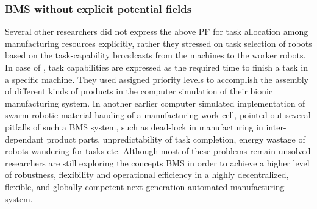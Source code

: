 \subsubsection*{BMS without explicit potential fields}
Several other researchers did not express the above PF for task allocation among manufacturing resources explicitly, rather they stressed on task selection of robots based on the task-capability broadcasts from the machines to the worker robots. In case of \cite{Lazinica+2007}, task capabilities are expressed as the required time to finish a task in a specific machine. They used assigned priority levels to accomplish the assembly of different kinds of products in the computer simulation of their bionic manufacturing system. In another earlier computer simulated implementation of swarm robotic material handing of a manufacturing work-cell, \cite{Doty+1993} pointed out several pitfalls of such a BMS system, such as dead-lock in manufacturing in inter-dependant product parts, unpredictability of task completion, energy wastage of robots wandering for tasks etc. Although most of these problems remain unsolved researchers are still exploring the concepts BMS in order to achieve a higher level of robustness, flexibility and operational efficiency in a highly decentralized, flexible, and  globally competent next generation automated manufacturing system.